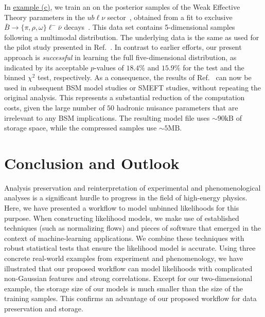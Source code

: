 \documentclass[aps,nofootinbib,superscriptaddress,reprint,preprintnumbers]{revtex4-1}
\newcommand{\pvalues}{$p$-values\xspace}
\begin{document}
In \hyperref[fig:results:WET]{example (c)}, we train an \LM on the posterior samples of the Weak Effective Theory parameters
in the $ub\ell\nu$ sector~\cite{EOS-DATA-2023-01}, obtained from a fit to exclusive
$\bar{B}\to \lbrace \pi,\rho,\omega\rbrace \ell^-\bar\nu$ decays~\cite{Leljak:2023gna}.
This data set contains 5-dimensional samples following a multimodal distribution.
The underlying data is the same as used for the pilot study presented in Ref.~\cite{Beck:2023xou}.
In contrast to earlier efforts, our present approach is \emph{successful} in learning the full five-dimensional
distribution, as indicated by its acceptable \pvalues of $18.4\%$ and $15.9\%$ for the \KS test and the binned $\chi^2$ test, respectively.
As a consequence, the results of Ref.~\cite{Leljak:2023gna} can now be used in subsequent
BSM model studies or SMEFT studies, without repeating the original analysis. This represents a substantial
reduction of the computation costs, given the large number of $50$ hadronic nuisance parameters that
are irrelevant to any BSM implications.
The resulting model file uses $\sim 90\text{kB}$ of storage space, while the compressed samples use $\sim 5\text{MB}$.


\section{Conclusion and Outlook}

Analysis preservation and reinterpretation of experimental and phenomenological analyses is a significant hurdle
to progress in the field of high-energy physics.
Here, we have presented a workflow to model unbinned likelihoods for this purpose.
When constructing likelihood models, we make use of established techniques (such as normalizing flows)
and pieces of software that emerged in the context of machine-learning applications.
We combine these techniques with robust statistical tests that ensure the likelihood model is accurate.
Using three concrete real-world examples from experiment and phenomenology,
we have illustrated that our proposed workflow can model likelihoods with complicated non-Gaussian features and strong correlations.
Except for our two-dimensional example, the storage size of our models is much smaller than the size of the training samples.
This confirms an advantage of our proposed workflow for data preservation and storage.
\\
\end{document}
